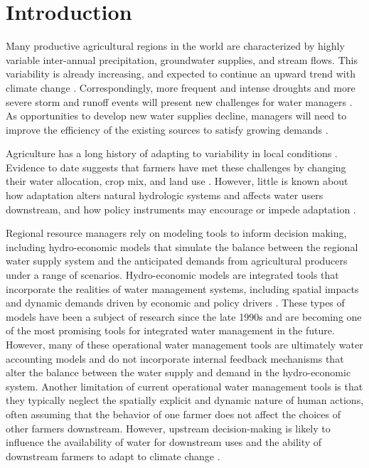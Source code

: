 \section{Introduction}

Many productive agricultural regions in the world are characterized by highly variable inter-annual precipitation, groundwater supplies, and stream flows. This variability is already increasing, and expected to continue an upward trend with climate change \citep{Groisman1994, Easterling2000, McCabe2005a, Mote2006b, Long2013}. Correspondingly, more frequent and intense droughts and more severe storm and runoff events will present new challenges for water managers \citep{Harou2006, Gorelick2015}. As opportunities to develop new water supplies decline, managers will need to improve the efficiency of the existing sources to satisfy growing demands \citep{USArmyCorpsofEngineers2012}. 

Agriculture has a long history of adapting to variability in local conditions \citep{McCarl2015, Rose2015}. Evidence to date suggests that farmers have met these challenges by changing their water allocation, crop mix, and land use \citep{Schneider, Bryant2000, Menzel2006}. However, little is known about how adaptation alters natural hydrologic systems and affects water users downstream, and how policy instruments may encourage or impede adaptation \citep{White2011}.

Regional resource managers rely on modeling tools to inform decision making, including hydro-economic models that simulate the balance between the regional water supply system and the anticipated demands from agricultural producers under a range of scenarios. Hydro-economic models are integrated tools that incorporate the realities of water management systems, including spatial impacts and dynamic demands driven by economic and policy drivers \citep{Harou2009b}. These types of models have been a subject of research since the late 1990s \citep{Pulido-Velazquez, Ward1996, Cai2003, Ward2006, Cai2008, Brouwer2008, Medellin-Azuara2011} and are becoming one of the most promising tools for integrated water management in the future. However, many of these operational water management tools are ultimately water accounting models and do not incorporate internal feedback mechanisms that alter the balance between the water supply and demand in the hydro-economic system. Another limitation of current operational water management tools is that they typically neglect the spatially explicit and dynamic nature of human actions, often assuming that the behavior of one farmer does not affect the choices of other farmers downstream. However, upstream decision-making is likely to influence the availability of water for downstream uses and the ability of downstream farmers to adapt to climate change \citep{Maneta2009e, Maneta2009c}.

